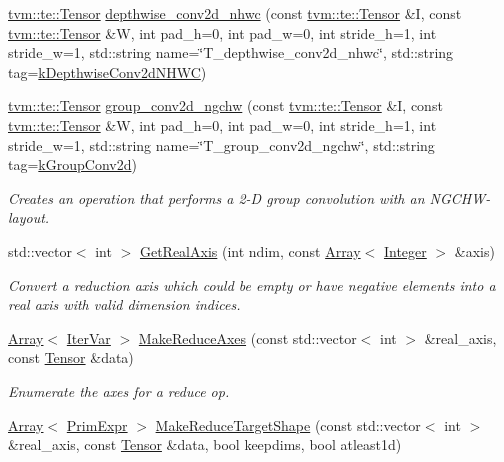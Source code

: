 \begin{DoxyCompactItemize}
\hyperlink{classtvm_1_1te_1_1Tensor}{tvm\+::te\+::\+Tensor} \hyperlink{namespacetopi_a3bc090c96d064609982d155da4c7a9d9}{depthwise\+\_\+conv2d\+\_\+nhwc} (const \hyperlink{classtvm_1_1te_1_1Tensor}{tvm\+::te\+::\+Tensor} \&I, const \hyperlink{classtvm_1_1te_1_1Tensor}{tvm\+::te\+::\+Tensor} \&W, int pad\+\_\+h=0, int pad\+\_\+w=0, int stride\+\_\+h=1, int stride\+\_\+w=1, std\+::string name=\char`\"{}T\+\_\+depthwise\+\_\+conv2d\+\_\+nhwc\char`\"{}, std\+::string tag=\hyperlink{namespacetopi_a00fa259c7a4c72504f9ac906062e9ebc}{k\+Depthwise\+Conv2d\+N\+H\+WC})
\item 
\hyperlink{classtvm_1_1te_1_1Tensor}{tvm\+::te\+::\+Tensor} \hyperlink{namespacetopi_aa6c2cdf56a7e63a41e964e91df6a01bd}{group\+\_\+conv2d\+\_\+ngchw} (const \hyperlink{classtvm_1_1te_1_1Tensor}{tvm\+::te\+::\+Tensor} \&I, const \hyperlink{classtvm_1_1te_1_1Tensor}{tvm\+::te\+::\+Tensor} \&W, int pad\+\_\+h=0, int pad\+\_\+w=0, int stride\+\_\+h=1, int stride\+\_\+w=1, std\+::string name=\char`\"{}T\+\_\+group\+\_\+conv2d\+\_\+ngchw\char`\"{}, std\+::string tag=\hyperlink{namespacetopi_a4147e63b5ce67e3340ed5096bf6b9455}{k\+Group\+Conv2d})
\begin{DoxyCompactList}\small\item\em Creates an operation that performs a 2-\/D group convolution with an N\+G\+C\+H\+W-\/layout. \end{DoxyCompactList}\item 
std\+::vector$<$ int $>$ \hyperlink{namespacetopi_a2c7364c2934ba1b64d9d9a5837e77497}{Get\+Real\+Axis} (int ndim, const \hyperlink{classtvm_1_1Array}{Array}$<$ \hyperlink{classtvm_1_1Integer}{Integer} $>$ \&axis)
\begin{DoxyCompactList}\small\item\em Convert a reduction axis which could be empty or have negative elements into a real axis with valid dimension indices. \end{DoxyCompactList}\item 
\hyperlink{classtvm_1_1Array}{Array}$<$ \hyperlink{classtvm_1_1tir_1_1IterVar}{Iter\+Var} $>$ \hyperlink{namespacetopi_aa9ac5704585fb8f3592081e0833c9163}{Make\+Reduce\+Axes} (const std\+::vector$<$ int $>$ \&real\+\_\+axis, const \hyperlink{classtvm_1_1te_1_1Tensor}{Tensor} \&data)
\begin{DoxyCompactList}\small\item\em Enumerate the axes for a reduce op. \end{DoxyCompactList}\item 
\hyperlink{classtvm_1_1Array}{Array}$<$ \hyperlink{classtvm_1_1PrimExpr}{Prim\+Expr} $>$ \hyperlink{namespacetopi_ab69e23e61282f3e99cacf20b55c57d13}{Make\+Reduce\+Target\+Shape} (const std\+::vector$<$ int $>$ \&real\+\_\+axis, const \hyperlink{classtvm_1_1te_1_1Tensor}{Tensor} \&data, bool keepdims, bool atleast1d)

\end{DoxyCompactItemize}
